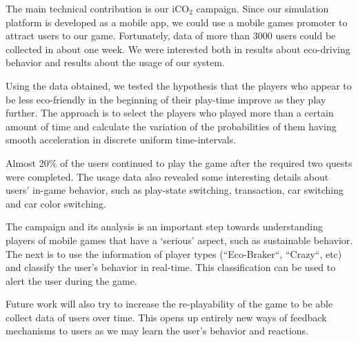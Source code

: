\documentclass[preprint,authoryear,12pt]{elsarticle}
\newcommand{\hlc}[2][yellow]{ {\sethlcolor{#1} \hl{#2}} }
\begin{document}
The main technical contribution is our iCO$_2$ campaign. Since our simulation platform is developed as a mobile app, we could use a mobile games promoter to attract users to our game. Fortunately, data of more than 3000 users could be collected in about one week. We were interested both in results about eco-driving behavior and results about the usage of our system.

Using the data obtained, we tested the hypothesis that the players who appear to be less eco-friendly in the beginning of their play-time improve as they play further. The approach is to select the players who played more than a certain amount of time and calculate the variation of the probabilities of them having smooth acceleration in discrete uniform time-intervals. 

Almost 20\% of the users continued to play the game after the required two quests were completed.
The usage data also revealed some interesting details about users' in-game behavior, such as play-state switching, transaction, car switching and car color switching.




The campaign and its analysis is an important step towards understanding players of mobile games that have a `serious' aspect, such as sustainable behavior. The next is to use the information of player types (``Eco-Braker``, ``Crazy``, etc) and classify the user's behavior in real-time. This classification can be used to alert the user during the game.

Future work will also try to increase the re-playability of the game to be able collect data of users over time. This opens up entirely new ways of feedback mechanisms to users as we may learn the user's behavior and reactions.
\end{document}
